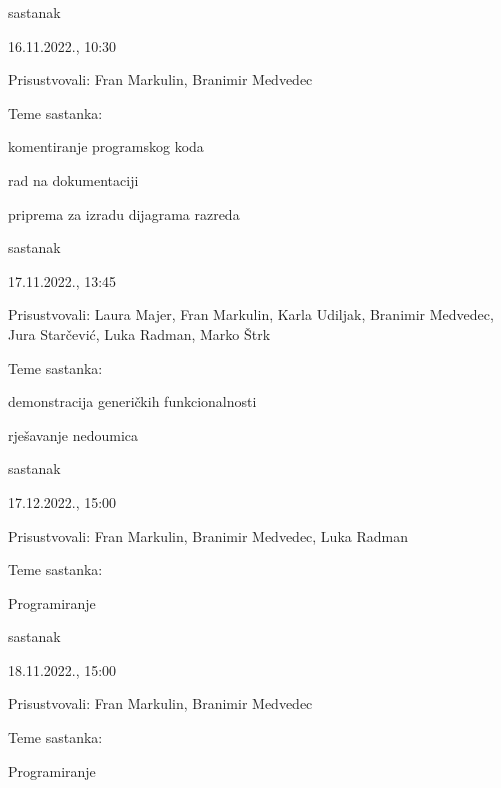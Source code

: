 \begin{packed_enum}
			\item  sastanak
			
			\item[] \begin{packed_item}
				\item 16.11.2022., 10:30
				\item Prisustvovali: Fran Markulin, Branimir Medvedec
				\item Teme sastanka: 
				\begin{packed_item}
					\item  komentiranje programskog koda
					\item rad na dokumentaciji
					\item priprema za izradu dijagrama razreda
				\end{packed_item}
			\end{packed_item}

			\item  sastanak
			
			\item[] \begin{packed_item}
				\item 17.11.2022., 13:45
				\item Prisustvovali: Laura Majer, Fran Markulin, Karla Udiljak, Branimir Medvedec, Jura Starčević, Luka Radman, Marko Štrk
				\item Teme sastanka: 
				\begin{packed_item}
					\item   demonstracija generičkih funkcionalnosti
					\item rješavanje nedoumica
				\end{packed_item}
			\end{packed_item}
\item  sastanak
    \item[] \begin{packed_item}
				\item 17.12.2022., 15:00
				\item Prisustvovali: Fran Markulin,  Branimir Medvedec, Luka Radman
				\item Teme sastanka: 
				\begin{packed_item}
					\item   Programiranje
				\end{packed_item}
			\end{packed_item}
\item  sastanak
   \item[] \begin{packed_item}
				\item 18.11.2022., 15:00
				\item Prisustvovali: Fran Markulin,  Branimir Medvedec
				\item Teme sastanka: 
				\begin{packed_item}
					\item  Programiranje
				\end{packed_item}
			\end{packed_item}
			
			
		\end{packed_enum}
		

